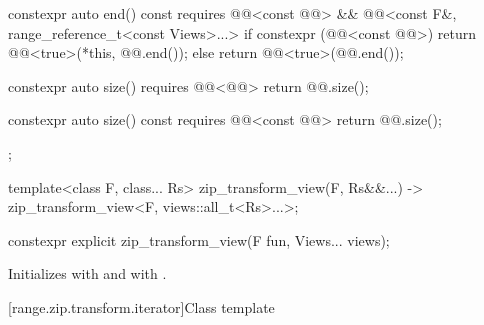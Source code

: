 \begin{codeblock}
{{    constexpr auto end() const
      requires @@<const @@> &&
               @@<const F&, range_reference_t<const Views>...> {
      if constexpr (@@<const @@>) {
        return @@<true>(*this, @@.end());
      } else {
        return @@<true>(@@.end());
      }
    }

    constexpr auto size() requires @@<@@> {
      return @@.size();
    }

    constexpr auto size() const requires @@<const @@> {
      return @@.size();
    }
  };

  template<class F, class... Rs>
    zip_transform_view(F, Rs&&...) -> zip_transform_view<F, views::all_t<Rs>...>;
}
\end{codeblock}

\begin{itemdecl}
constexpr explicit zip_transform_view(F fun, Views... views);
\end{itemdecl}

\begin{itemdescr}
\pnum
\effects
Initializes  with  and
 with .
\end{itemdescr}

[range.zip.transform.iterator]{Class template }

